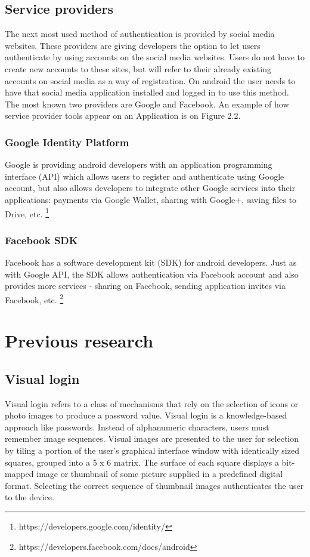 \subsection{Service providers}
The next most used method of authentication is provided by social media websites. These providers are giving developers the option to let users authenticate by using accounts on the social media websites. Users do not have to create new accounts to these sites, but will refer to their already existing accounts on social media as a way of registration. On android the user needs to have that social media application installed and logged in to use this method. The most known two providers are Google and Facebook. An example of how service provider tools appear on an Application is on Figure 2.2.

\subsubsection{Google Identity Platform}
Google is providing android developers with an application programming interface (API) which allows users to register and authenticate using Google account, but also allows developers to integrate other Google services into their applications: payments via Google Wallet, sharing with Google+, saving files to Drive, etc. \footnote[5]{https://developers.google.com/identity/}

\subsubsection{Facebook SDK}
Facebook has a software development kit (SDK) for android developers. Just as with Google API, the SDK allows authentication via Facebook account and also provides more services - sharing on Facebook, sending application invites via Facebook, etc. \footnote[6]{https://developers.facebook.com/docs/android}

\section{Previous research}

\subsection{Visual login}
Visual login refers to a class of mechanisms that rely on the selection of icons or photo images to produce a
password value. Visual login is a knowledge-based approach like passwords. Instead of alphanumeric characters, users must remember image sequences. Visual images are presented to the user for selection by tiling a portion of the user's graphical interface window with identically sized squares, grouped into a 5 x 6 matrix. The surface of each square displays a bit-mapped image or thumbnail of some picture supplied in a predefined digital format. Selecting the correct sequence of thumbnail images authenticates the user to the device. \cite{jansen2003authenticating}


